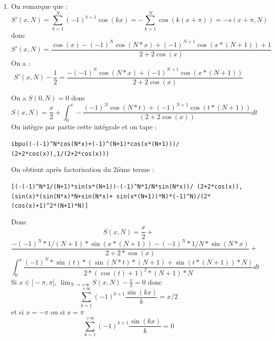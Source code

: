 \documentclass[a4paper,11pt]{book}
\begin{document}
\begin{enumerate}
{\bf Autre m\'ethode}\\
On peut aussi simplifier : $2*\sin(x/2)*s(x,N)$.\\
On tape :\\
{\tt tlin(2*sin(x/2)*cos(k*x))}\\
On obtient :\\
{\tt sin((2*k*x+x)/2)-sin((2*k*x-x)/2)}\\
Donc on a :
$$\sum_{k=1}^N\sin((2kx+x)/2)-\sin((2kx-x)/2)=\sin((2Nx+x)/2)-\sin(x/2)$$
et
$$2\sin(x/2)*s(x,N)=\sum_{k=1}^N2\sin(x/2)\cos(kx)=\sin((2Nx+x)/2)-\sin(x/2)$$
On v\'erifie et on tape:\\
{\tt tlin(2*sin(x/2)*(-sin(x/2)+sin((2*N+1)*x/2)))}\\
On obtient :\\
{\tt -1+cos(x)+cos(N*x)-cos(N*x+x)}\\
On tape:\\
{\tt trigsin(trigexpand(2*cos(2*(x/2))-2))}\\
On obtient :\\
{\tt -4*sin(x/2)\verb|^|2}\\
On tape:\\
{\tt tlin((2*cos((N+1)*x/2)*sin(N*x/2))}\\
On obtient :\\
{\tt sin((2*N*x+x)/2)-sin(x/2)}\\
Donc on peut \'ecrire $s(x,N)$ de 4 mani\`eres :
$$s(x,N)=\sum_{k=1}^N\cos(kx)=\frac{\sin((2N+1)x/2)-\sin(x/2)}{2\sin(x/2)}=$$
$$\frac{2\cos((N+1)x/2)\sin(Nx/2))}{2\sin(x/2)}=\frac{-1+cos(x)+cos(Nx)-cos((N+1)x)}{-4\sin^2(x/2)}=$$
$$\frac{1-cos(x)-cos(Nx)+cos((N+1)x)}{2*cos(x)-2)}$$
\item On remarque que :
$$S'(x,N)=\sum_{k=1}^N(-1)^{k+1}\cos(kx)=-\sum_{k=1}^N\cos(k(x+\pi))=-s(x+\pi,N)$$ 
donc
$$S'(x,N)=\frac{\cos(x)-(-1)^N\cos(N*x)+(-1)^{N+1}\cos(x*(N+1))+1}{2+2\cos(x)}$$
On a :
$$S'(x,N)-\frac{1}{2}=\frac{-(-1)^N\cos(N*x)+(-1)^{N+1}\cos(x*(N+1))}{2+2\cos(x)}$$

On a $S(0,N)=0$ donc 
$$S(x,N)=\frac{x}{2}+\int_0^x-\frac{(-1)^N\cos(N*t)+(-1)^{N+1}\cos(t*(N+1))}{(2+2\cos(x))}dt$$
On int\`egre par partie cette int\'egrale et on tape :
\begin{center}{\tt ibpu((-(-1)\verb|^|N*cos(N*x)+(-1)\verb|^|(N+1)*cos(x*(N+1)))/ (2+2*cos(x)),1/(2+2*cos(x)))}\end{center}
On obtient apr\`es factorisation du 2i\`eme terme :
\begin{center}{\tt [(-(-1)\verb|^|N*1/(N+1)*sin(x*(N+1))-(-1)\verb|^|N*1/N*sin(N*x))/ (2+2*cos(x)),(sin(x)*(sin(N*x)*N+sin(N*x)+ sin(x*(N+1))*N)*(-1)\verb|^|N)/(2*(cos(x)+1)\verb|^|2*(N+1)*N)]}\end{center}
Donc 
$$S(x,N)=\frac{x}{2}+$$
$$\frac{-(-1)^N*1/(N+1)*\sin(x*(N+1))-(-1)^N*1/N*\sin(N*x)}{2+2*\cos(x)}+$$
$$\int_0^x\frac{(-1)^N*\sin(t)*(\sin(N*t)*(N+1)+\sin(t*(N+1))*N)}{2*(\cos(t)+1)^2*(N+1)*N}dt$$
Si $x\in]-\pi,\pi[$, $\displaystyle \lim_{N\rightarrow +\infty}{S(x,N)-\frac{x}{2}}=0$ donc
$$\sum_{k=1}^{+\infty}(-1)^{k+1}\frac{\sin(kx)}{k}=x/2$$
et si $x=-\pi$ ou si $x=\pi$
$$\sum_{k=1}^{+\infty}(-1)^{k+1}\frac{\sin(kx)}{k}=0$$
\end{enumerate}
\end{document}

